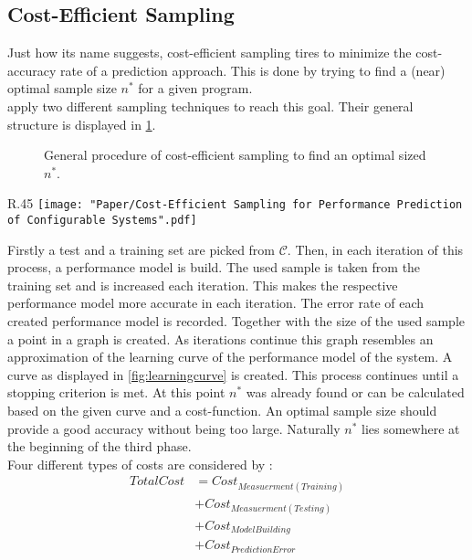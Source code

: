 \subsection{Cost-Efficient Sampling}\label{sec:CESampling}
Just how its name suggests, cost-efficient sampling tires to minimize the cost-accuracy rate of a prediction approach. This is done by trying to find a (near) optimal sample size $n^*$ for a given program.\\
\citet{CostEfficientSampling_Gou_Siegmund_2015} apply two different sampling techniques to reach this goal. Their general structure is displayed in \cref{fig:CEGeneral}.
\newpage
\begin{figure}[h]
	\centering
	
 	\caption{General procedure of cost-efficient sampling to find an optimal sized $n^*$.}
 	\label{fig:CEGeneral}
\end{figure}
\begin{wrapfigure}[21]{R}{.45\textwidth}	
	\texttt{[image: "Paper/Cost-Efficient Sampling for Performance Prediction of Configurable Systems".pdf]}
	\captionsetup{width=0.9\linewidth}
	\label{fig:learningcurve}
\end{wrapfigure}
Firstly a test and a training set are picked from $\mathcal{C}$. Then, in each iteration of this process, a performance model is build. The used sample is taken from the training set and is increased each iteration. This makes the respective performance model more accurate in each iteration. The error rate of each created performance model is recorded. Together with the size of the used sample a point in a graph is created. As iterations continue this graph resembles an approximation of the learning curve of the performance model of the system. A curve as displayed in \cref{fig:learningcurve} is created. This process continues until  a stopping criterion is met. At this point $n^*$ was already found or can be calculated based on the given curve and a cost-function. An optimal sample size should provide a good accuracy without being too large. Naturally $n^*$ lies somewhere at the beginning of the third phase.\\
Four different types of costs are considered by \citet{CostEfficientSampling_Gou_Siegmund_2015}:
\begin{equation}
\begin{split}
TotalCost &= Cost_{Measuerment(Training)}\\
&+ Cost_{Measuerment(Testing)}\\
&+ Cost_{ModelBuilding}\\
&+ Cost_{PredictionError}\\
\end{split}
\end{equation}

